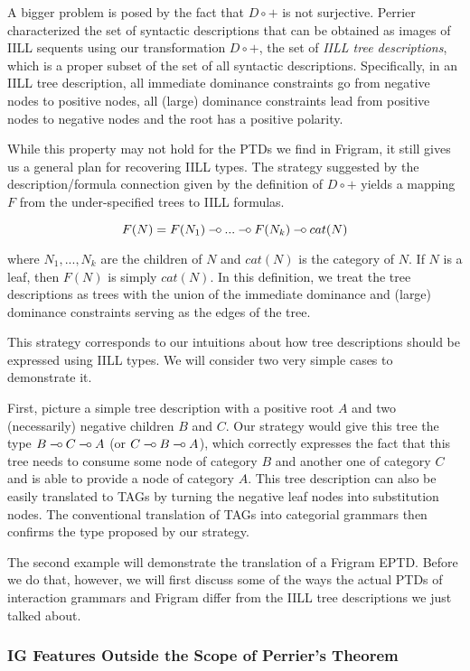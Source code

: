 A bigger problem is posed by the fact that $D \circ +$ is not
surjective. Perrier \cite{perrier2001intuitionistic} characterized the
set of syntactic descriptions that can be obtained as images of IILL
sequents using our transformation $D \circ +$, the set of \emph{IILL
  tree descriptions}, which is a proper subset of the set of all
syntactic descriptions. Specifically, in an IILL tree description, all
immediate dominance constraints go from negative nodes to positive
nodes, all (large) dominance constraints lead from positive nodes to
negative nodes and the root has a positive polarity.

While this property may not hold for the PTDs we find in Frigram, it
still gives us a general plan for recovering IILL types. The strategy
suggested by the description/formula connection given by the definition
of $D \circ +$ yields a mapping $F$ from the under-specified trees to
IILL formulas.

$$
F(N) = F(N_1) \mathbin{{-}\mkern-3.5mu{\circ}} ... \mathbin{{-}\mkern-3.5mu{\circ}} F(N_k) \mathbin{{-}\mkern-3.5mu{\circ}} cat(N)
$$

where $N_1, ..., N_k$ are the children of $N$ and $cat(N)$ is the
category of $N$. If $N$ is a leaf, then $F(N)$ is simply $cat(N)$. In
this definition, we treat the tree descriptions as trees with the union
of the immediate dominance and (large) dominance constraints serving as
the edges of the tree.

This strategy corresponds to our intuitions about how tree descriptions
should be expressed using IILL types. We will consider two very simple
cases to demonstrate it.

First, picture a simple tree description with a positive root $A$ and
two (necessarily) negative children $B$ and $C$. Our strategy would give
this tree the type $B \mathbin{{-}\mkern-3.5mu{\circ}} C \mathbin{{-}\mkern-3.5mu{\circ}} A$ (or $C \mathbin{{-}\mkern-3.5mu{\circ}} B \mathbin{{-}\mkern-3.5mu{\circ}} A$), which
correctly expresses the fact that this tree needs to consume some node
of category $B$ and another one of category $C$ and is able to provide a
node of category $A$. This tree description can also be easily
translated to TAGs by turning the negative leaf nodes into substitution
nodes. The conventional translation of TAGs into categorial grammars
then confirms the type proposed by our strategy.

The second example will demonstrate the translation of a Frigram
EPTD. Before we do that, however, we will first discuss some of the ways
the actual PTDs of interaction grammars and Frigram differ from the IILL
tree descriptions we just talked about.

\subsubsection{IG Features Outside the Scope of Perrier's Theorem}


